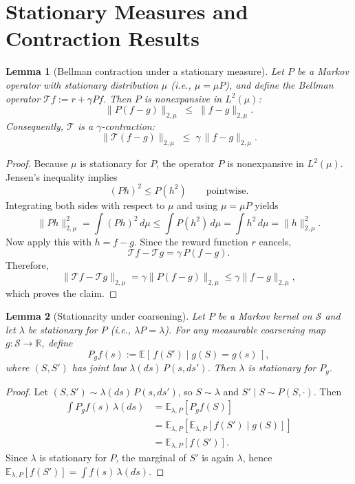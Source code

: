\documentclass{article}
\theoremstyle{plain}
\newtheorem{lemma}{Lemma}
\theoremstyle{definition}
\theoremstyle{remark}
\begin{document}
 


 

 




\section{Stationary Measures and Contraction Results}
\label{appendix::stationary}

\begin{lemma}[Bellman contraction under a stationary measure]
\label{lemma::contraction}
Let $P$ be a Markov operator with stationary distribution $\mu$ (i.e., $\mu=\mu P$),
and define the Bellman operator $\mathcal T f := r + \gamma P f$.
Then $P$ is nonexpansive in $L^2(\mu)$:
\[
\|P(f-g)\|_{2,\mu} \;\le\; \|f-g\|_{2,\mu}.
\]
Consequently, $\mathcal T$ is a $\gamma$-contraction:
\[
\|\mathcal T (f-g)\|_{2,\mu}
\;\le\;
\gamma\,\|f-g\|_{2,\mu}.
\]
\end{lemma}
\begin{proof}
Because $\mu$ is stationary for $P$, the operator $P$ is nonexpansive in
$L^2(\mu)$. Jensen's inequality implies
\[
(P h)^2 \le P(h^2) \qquad\text{pointwise}.
\]
Integrating both sides with respect to $\mu$ and using $\mu = \mu P$ yields
\[
\|P h\|_{2,\mu}^2
= \int (P h)^2 \, d\mu
\le \int P(h^2)\, d\mu
= \int h^2\, d\mu
= \|h\|_{2,\mu}^2.
\]
Now apply this with $h = f - g$. Since the reward function $r$ cancels,
\[
\mathcal{T}f - \mathcal{T}g
= \gamma\, P(f-g).
\]
Therefore,
\[
\|\mathcal{T} f - \mathcal{T} g\|_{2,\mu}
= \gamma \|P(f-g)\|_{2,\mu}
\le \gamma \|f-g\|_{2,\mu},
\]
which proves the claim.
\end{proof}

\begin{lemma}[Stationarity under coarsening]
\label{lemma:aggregated-stationary}
Let $P$ be a Markov kernel on $\mathcal S$ and let $\lambda$ be stationary for $P$
(i.e., $\lambda P = \lambda$).
For any measurable coarsening map $g:\mathcal S\to\mathbb R$, define
\[
P_g f(s)
:=
\mathbb{E}[\,f(S') \mid g(S)=g(s)\,],
\]
where $(S,S')$ has joint law $\lambda(ds)\,P(s,ds')$.
Then $\lambda$ is stationary for $P_g$.
\end{lemma}

\begin{proof}
Let $(S,S')\sim \lambda(ds)\,P(s,ds')$, so $S\sim\lambda$ and $S'\mid S\sim P(S,\cdot)$.
Then
\begin{align*}
\int P_g f(s)\,\lambda(ds)
&=
\mathbb{E}_{\lambda,P}\!\left[P_g f(S)\right] \\[0.3em]
&=
\mathbb{E}_{\lambda,P}\!\left[\mathbb{E}_{\lambda,P}\!\left[f(S') \mid g(S)\right]\right] \\[0.3em]
&=
\mathbb{E}_{\lambda,P}[f(S')].
\end{align*}
Since $\lambda$ is stationary for $P$, the marginal of $S'$ is again $\lambda$, hence
$\mathbb{E}_{\lambda,P}[f(S')] = \int f(s)\,\lambda(ds)$.
\end{proof}
\end{document}

